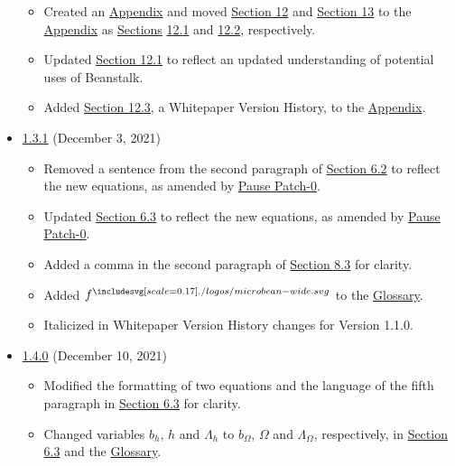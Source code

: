 \documentclass[class=article, crop=false]{standalone}
\begin{document}
\begin{itemize}[topsep=0pt, itemsep=3pt,leftmargin=16pt]
\begin{itemize}
        \item Created an \hyperlink{section.14}{Appendix} and moved \hyperlink{subsection.12.1}{Section 12} and \hyperlink{subsection.12.2}{Section 13} to the \hyperlink{section.14}{Appendix} as \hyperlink{section.12}{Sections} \hyperlink{subsection.12.1}{12.1} and \hyperlink{subsection.12.2}{12.2}, respectively. 
        \item Updated \hyperlink{subsection.12.1}{Section 12.1} to reflect an updated understanding of potential uses of Beanstalk. 
        \item Added \hyperlink{subsection.12.3}{Section 12.3}, a Whitepaper Version History, to the \hyperlink{section.14}{Appendix}.
    \newpage
    \end{itemize}
    \item \href{https://github.com/BeanstalkFarms/Beanstalk-Whitepaper/blob/master/version-history/beanstalk1_3_1.pdf}{1.3.1} (December 3, 2021)
    \begin{itemize}
        \item Removed a sentence from the second paragraph of \hyperlink{subsection.6.2}{Section 6.2} to reflect the new  equations, as amended by \href{https://snapshot.org/\#/beanstalkfarms.eth/proposal/0xffc6033eb5a4e53f4da5df1c4011bacc12244914885fe11e6a6f2d09d856feed}{Pause Patch-0}.
        \item Updated \hyperlink{subsection.6.3}{Section 6.3} to reflect the new  equations, as amended by \href{https://snapshot.org/\#/beanstalkfarms.eth/proposal/0xffc6033eb5a4e53f4da5df1c4011bacc12244914885fe11e6a6f2d09d856feed}{Pause Patch-0}.
        \item Added a comma in the second paragraph of \hyperlink{subsection.8.3}{Section 8.3} for clarity.
        \item Added $f^{\bean}$ to the \hyperlink{subsection.14.11}{Glossary}. 
        \item Italicized  in Whitepaper Version History changes for Version 1.1.0.
    \end{itemize}
    \item \href{https://github.com/BeanstalkFarms/Beanstalk-Whitepaper/blob/master/version-history/beanstalk1_4_0.pdf}{1.4.0} (December 10, 2021)
    \begin{itemize}
        \item Modified the formatting of two equations and the language of the fifth paragraph in \hyperlink{subsection.6.3}{Section 6.3} for clarity.
        \item Changed variables $b_h$, $h$ and $\Lambda_h$ to $b_{\Omega}$, $\Omega$ and $\Lambda_{\Omega}$, respectively, in \hyperlink{subsection.6.3}{Section 6.3} and the \hyperlink{subsection.14.11}{Glossary}.

\end{itemize}
\end{itemize}
\end{document}
